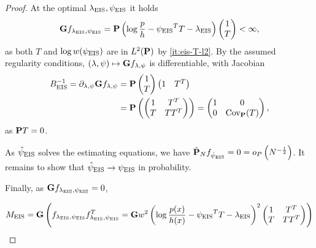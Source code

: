 \begin{proof}
    At the optimal $\lambda_{\eis}, \peis$ it holds
    \begin{align*}
    \G f_{\lambda_{\eis},\peis} = \P \left( \log \frac{p}{h} - \peis^{T}T - \lambda_{\eis}  \right) \begin{pmatrix}
        1 \\ T
    \end{pmatrix} < \infty,
    \end{align*}
    as both $T$ and $\log w(\peis)$ are in $L^{2}(\P)$ by \ref{it:eis-T-l2}.
    By the assumed regularity conditions, $(\lambda,\psi) \mapsto \G f_{\lambda, \psi}$ is differentiable, with Jacobian
    \begin{align*}
    B_{\eis}^{-1} = \partial_{\lambda,\psi}\G f_{\lambda,\psi} &= \P \begin{pmatrix}
        1 \\ T
    \end{pmatrix} \begin{pmatrix}
        1 & T^{T}
    \end{pmatrix}\\
        &= \P \left( \begin{pmatrix}
            1 & T^{T} \\
            T & TT^{T}
        \end{pmatrix} \right) = \begin{pmatrix}
            1 & 0 \\
            0 & \cov_{\P} (T)
        \end{pmatrix},
    \end{align*}
    as $\P T = 0$.

    As $\hpeis$ solves the estimating equations, we have $\hat\P_{N} f_{\hpeis} = 0 = o_{P} \left( N^{-\frac{1}{2}} \right)$. It remains to show that $\hpeis \to \peis$ in probability. 

    Finally, as $\G f_{\lambda_{\eis},\peis}=0$, 

    $$
    M_{\eis} = \G \left(f_{\lambda_{\eis},\peis} f_{\lambda_{\eis},\peis}^T = \G w^{2} \left( \log \frac{p(x)}{h(x)} - \peis^{T}T - \lambda_{\eis}\right)^{2} \begin{pmatrix}
        1 & T^{T} \\
        T & TT^{T}
    \end{pmatrix}\right)
    $$

    
\end{proof}

